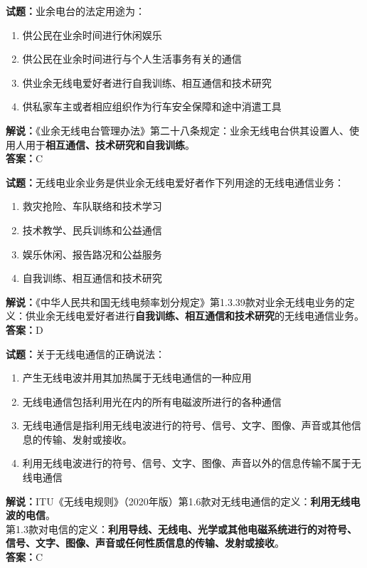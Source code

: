 \documentclass{ctexbook}
\begin{document}
\bigskip


\noindent\textbf{试题：}业余电台的法定用途为：
\begin{enumerate}[leftmargin=3em]
\item 供公民在业余时间进行休闲娱乐
\item 供公民在业余时间进行与个人生活事务有关的通信
\item 供业余无线电爱好者进行自我训练、相互通信和技术研究
\item 供私家车主或者相应组织作为行车安全保障和途中消遣工具
\end{enumerate}
\noindent\textbf{解说：}《业余无线电台管理办法》第二十八条规定：业余无线电台供其设置人、使用人用于\textbf{相互通信、技术研究和自我训练}。\\\noindent\textbf{答案：}C

\bigskip


\noindent\textbf{试题：}无线电业余业务是供业余无线电爱好者作下列用途的无线电通信业务：
\begin{enumerate}[leftmargin=3em]
\item 救灾抢险、车队联络和技术学习
\item 技术教学、民兵训练和公益通信
\item 娱乐休闲、报告路况和公益服务
\item 自我训练、相互通信和技术研究
\end{enumerate}
\noindent\textbf{解说：}《中华人民共和国无线电频率划分规定》第1.3.39款对业余无线电业务的定义：供业余无线电爱好者进行\textbf{自我训练、相互通信和技术研究}的无线电通信业务。\\\noindent\textbf{答案：}D

\bigskip


\noindent\textbf{试题：}关于无线电通信的正确说法：
\begin{enumerate}[leftmargin=3em]
\item 产生无线电波并用其加热属于无线电通信的一种应用
\item 无线电通信包括利用光在内的所有电磁波所进行的各种通信
\item 无线电通信是指利用无线电波进行的符号、信号、文字、图像、声音或其他信息的传输、发射或接收。
\item 利用无线电波进行的符号、信号、文字、图像、声音以外的信息传输不属于无线电通信
\end{enumerate}
\noindent\textbf{解说：}ITU《无线电规则》（2020年版）第1.6款对无线电通信的定义：\textbf{利用无线电波的电信}。\\
第1.3款对电信的定义：\textbf{利用导线、无线电、光学或其他电磁系统进行的对符号、信号、文字、图像、声音或任何性质信息的传输、发射或接收}。\\\noindent\textbf{答案：}C
\end{document}
